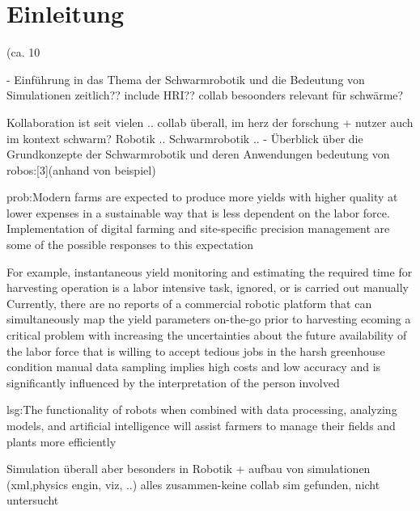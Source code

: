\documentclass[german,version-2020-11]{uzl-thesis}
\begin{document}
%
%


\chapter{Einleitung}


%
(ca. 10%




  - Einführung in das Thema der Schwarmrobotik und die Bedeutung von Simulationen
zeitlich??
include HRI?? collab besoonders relevant für schwärme?

Kollaboration ist seit vielen ..
collab überall, im herz der forschung + nutzer
auch im kontext schwarm?
Robotik ..
Schwarmrobotik ..
  - Überblick über die Grundkonzepte der Schwarmrobotik und deren Anwendungen
  bedeutung von robos:[3](anhand von beispiel)
      
  prob:Modern farms are expected to produce more yields with higher quality at lower expenses in a sustainable way that is less dependent on the labor force. Implementation of digital farming and site-specific precision management are some of the possible responses to this expectation

  For example,  instantaneous yield monitoring and estimating the required time for harvesting operation is a labor intensive task, ignored, or is carried out manually
  Currently, there are no reports of a commercial robotic platform that can simultaneously map the yield parameters on-the-go prior to harvesting
  ecoming a critical problem with increasing the uncertainties about the future availability of the labor force that is willing to accept tedious jobs in the harsh greenhouse condition
  manual data sampling implies high costs and low accuracy and is significantly influenced by the interpretation of the person involved

  lsg:The functionality of robots when combined with data processing, analyzing models, and artificial intelligence will assist farmers to manage their fields and plants more efficiently



Simulation überall aber besonders in Robotik + aufbau von simulationen (xml,physics engin, viz, ..)
alles zusammen-keine collab sim gefunden, nicht untersucht
\end{document}
